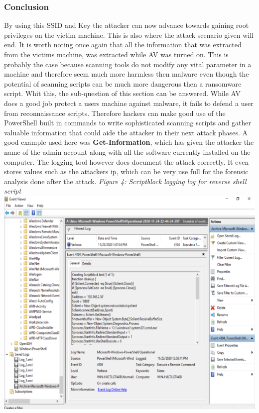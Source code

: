\documentclass{article}%
\begin{document}
\subsubsection{Conclusion}
By using this SSID and Key the attacker can now advance towards gaining root privileges on the victim machine. This is also where the attack scenario given will end. It is worth noting once again that all the information that was extracted from the victims machine, was extracted while AV was turned on. This is probably the case because scanning tools do not modify any vital parameter in a machine and therefore seem much more harmless then malware even though the potential of scanning scripts can be much more dangerous then a ransomware script. Whit this, the sub-question of this section can be answered. While AV does a good job protect a users machine against malware, it fails to defend a user from reconnaissance scripts. Therefore hackers can make good use of the PowerShell built in commands to write sophisticated scanning scripts and gather valuable information that could aide the attacker in their next attack phases. A good example used here was \textbf{Get-Information}, which has given the attacker the name of the admin account along with all the software currently installed on the computer. The logging tool however does document the attack correctly. It even stores values such as the attackers ip, which can be very use full for the forensic analysis done after the attack.\newpage
\textit{Figure 4: Scriptblock logging log for reverse shell script}\\
\includegraphics[scale=0.40]{20.png}
\end{document}

